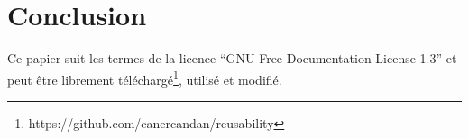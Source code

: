 %

\section{Conclusion}

Ce papier suit les termes de la licence ``GNU Free Documentation License 1.3'' et peut être librement téléchargé\footnote{https://github.com/canercandan/reusability}, utilisé et modifié.
